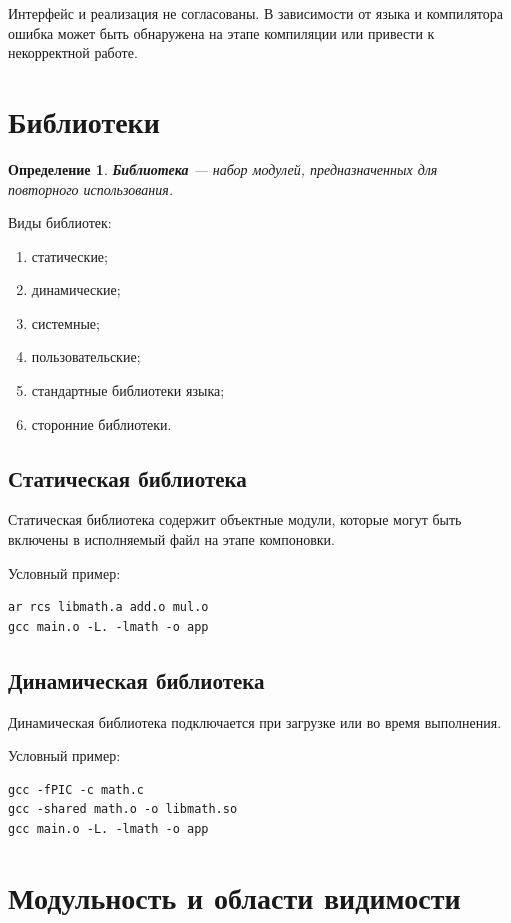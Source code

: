 \documentclass[12pt,a4paper]{article}
\newtheorem{definition}{Определение}
\begin{document}
Интерфейс и реализация не согласованы. В зависимости от языка и компилятора ошибка может быть обнаружена на этапе компиляции или привести к некорректной работе.

\section{Библиотеки}

\begin{definition}
\textbf{Библиотека} --- набор модулей, предназначенных для повторного использования.
\end{definition}

Виды библиотек:
\begin{enumerate}
  \item статические;
  \item динамические;
  \item системные;
  \item пользовательские;
  \item стандартные библиотеки языка;
  \item сторонние библиотеки.
\end{enumerate}

\subsection{Статическая библиотека}

Статическая библиотека содержит объектные модули, которые могут быть включены в исполняемый файл на этапе компоновки.

Условный пример:

\begin{lstlisting}
ar rcs libmath.a add.o mul.o
gcc main.o -L. -lmath -o app
\end{lstlisting}

\subsection{Динамическая библиотека}

Динамическая библиотека подключается при загрузке или во время выполнения.

Условный пример:

\begin{lstlisting}
gcc -fPIC -c math.c
gcc -shared math.o -o libmath.so
gcc main.o -L. -lmath -o app
\end{lstlisting}

\section{Модульность и области видимости}
\end{document}
